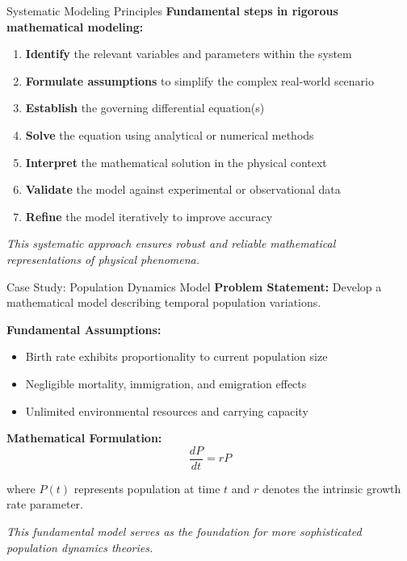 \documentclass[10pt,aspectratio=169]{beamer}
\newcommand{\highlight}[1]{\textcolor{mLightBrown}{\textbf{#1}}}
\newcommand{\concept}[1]{\textcolor{mDarkTeal}{\textbf{#1}}}
\newcommand{\emphasis}[1]{\textit{#1}}
\begin{document}
\begin{frame}{Systematic Modeling Principles}
    \concept{Fundamental steps in rigorous mathematical modeling:}
    
    \vspace{0.3cm}
    
    \begin{enumerate}
        \item \highlight{Identify} the relevant variables and parameters within the system
        \item \highlight{Formulate assumptions} to simplify the complex real-world scenario
        \item \highlight{Establish} the governing differential equation(s)
        \item \highlight{Solve} the equation using analytical or numerical methods
        \item \highlight{Interpret} the mathematical solution in the physical context
        \item \highlight{Validate} the model against experimental or observational data
        \item \highlight{Refine} the model iteratively to improve accuracy
    \end{enumerate}
    
    \vspace{0.3cm}
    
    \emphasis{This systematic approach ensures robust and reliable mathematical representations of physical phenomena.}
\end{frame}

\begin{frame}{Case Study: Population Dynamics Model}
    \concept{Problem Statement:} Develop a mathematical model describing temporal population variations.
    
    \vspace{0.3cm}
    
    \concept{Fundamental Assumptions:}
    \begin{itemize}
        \item Birth rate exhibits proportionality to current population size
        \item Negligible mortality, immigration, and emigration effects
        \item Unlimited environmental resources and carrying capacity
    \end{itemize}
    
    \vspace{0.3cm}
    
    \concept{Mathematical Formulation:}
    \begin{equation}
        \frac{dP}{dt} = rP
    \end{equation}
    
    where $P(t)$ represents population at time $t$ and $r$ denotes the intrinsic growth rate parameter.
    
    \vspace{0.2cm}
    
    \emphasis{This fundamental model serves as the foundation for more sophisticated population dynamics theories.}
\end{frame}
\end{document}
